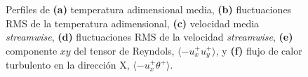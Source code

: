 \begin{figure}[H]

 \caption{Perfiles de \textbf{(a)} temperatura adimensional media, \textbf{(b)} fluctuaciones RMS de la temperatura adimensional, \textbf{(c)} velocidad media \textit{streamwise}, \textbf{(d)} fluctuaciones RMS de la velocidad \textit{streamwise}, \textbf{(e)} componente $xy$ del tensor de Reyndols, $\langle -u^+_x u^+_y \rangle$, y \textbf{(f)} flujo de calor turbulento en la dirección X, $\langle -u^+_x \theta^+ \rangle$.} 
 \label{fig:guo-05}
\end{figure}

